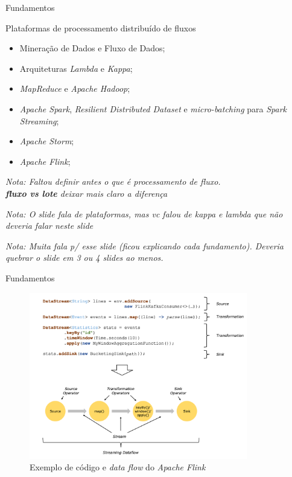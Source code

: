 \documentclass[aspectratio=43,10pt]{beamer}
\newcommand{\nota}[1]{\hspace*{-0.5cm}\textit{{\color[rgb]{1,0,0}Nota: #1}}}
\begin{document}
\begin{frame}[fragile]{Fundamentos}
\begin{alertblock}{Plataformas de processamento distribuído de fluxos}
  \begin{itemize}
    \item Mineração de Dados e Fluxo de Dados;
    \item Arquiteturas \emph{Lambda} e \emph{Kappa};
    \item \emph{MapReduce} e \emph{Apache Hadoop};
    \item \emph{Apache Spark}, \emph{Resilient Distributed Dataset} e
    \emph{micro-batching} para \emph{Spark Streaming};
    \item \emph{Apache Storm};
    \item \emph{Apache Flink};
  \end{itemize}
\end{alertblock}
\nota{Faltou definir antes o que é processamento de fluxo.\\
\textbf{fluxo vs lote} deixar mais claro a diferença}

\nota{O slide fala de plataformas, mas vc falou de kappa e lambda
que não deveria falar neste slide}

\nota{Muita fala p/ esse slide (ficou explicando cada fundamento).
Deveria quebrar o slide em 3 ou 4 slides ao menos.}
\end{frame}

\begin{frame}[fragile]{Fundamentos}
\begin{figure}[ht]
\centering
\includegraphics[width=0.85\textwidth]{figuras/dataflow-code-flink.png}
\caption{Exemplo de código e \emph{data flow} do \emph{Apache Flink} \cite{ApacheFlink2020}}
\label{fig:dataflow-flink}
\end{figure}
\end{frame}
\end{document}

